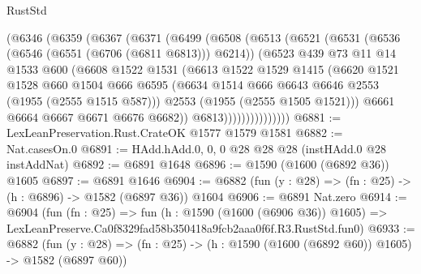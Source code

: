 \begin{lexlean}{RustStd}
\begin{coremodule}
              (@6346
                (@6359
                  (@6367
                    (@6371
                      (@6499
                        (@6508
                          (@6513
                            (@6521
                              (@6531
                                (@6536 (@6546 (@6551 (@6706 (@6811 @6813))) @6214))
                                (@6523
                                  @439
                                  @73
                                  @11
                                  @14
                                  @1533
                                  @600
                                  (@6608
                                    @1522
                                    @1531
                                    (@6613
                                      @1522
                                      @1529
                                      @1415
                                      (@6620
                                        @1521
                                        @1528
                                        @660
                                        @1504
                                        @666
                                        @6595
                                        (@6634
                                          @1514
                                          @666
                                          @6643
                                          @6646
                                          @2553
                                          (@1955 (@2555 @1515 @587)))
                                        @2553
                                        (@1955 (@2555 @1505 @1521)))
                                      @6661
                                      @6664
                                      @6667
                                      @6671
                                      @6676
                                      @6682))
                                  @6813)))))))))))))))
@6881 := LexLeanPreservation.Rust.CrateOK @1577 @1579 @1581
@6882 := Nat.casesOn.{0}
@6891 := HAdd.hAdd.{0, 0, 0} @28 @28 @28 (instHAdd.{0} @28 instAddNat)
@6892 := @6891 @1648
@6896 := @1590 (@1600 (@6892 @36)) @1605
@6897 := @6891 @1646
@6904 := @6882 (fun (y : @28) => (fn : @25) -> (h : @6896) -> @1582 (@6897 @36)) @1604
@6906 := @6891 Nat.zero
@6914 := @6904
    (fun (fn : @25) =>
    fun (h : @1590 (@1600 (@6906 @36)) @1605) =>
    LexLeanPreserve.Ca0f8329fad58b350418a9fcb2aaa0f6f.R3.RustStd.fun0)
@6933 := @6882
    (fun (y : @28) => (fn : @25) -> (h : @1590 (@1600 (@6892 @60)) @1605) -> @1582 (@6897 @60))

\end{coremodule}
\end{lexlean}
